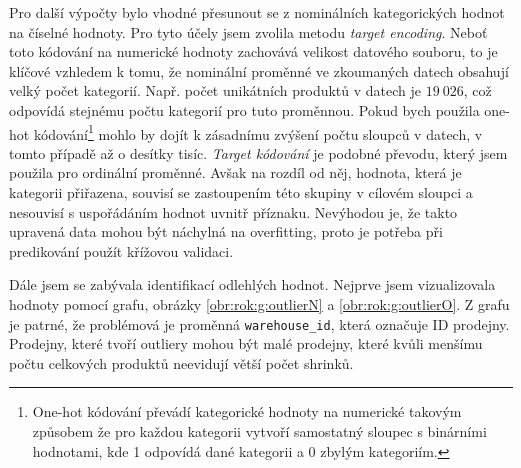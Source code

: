 Pro další výpočty bylo vhodné přesunout se z nominálních kategorických hodnot na číselné hodnoty. Pro tyto účely jsem zvolila metodu \emph{target encoding}.  %
Neboť toto kódování na numerické hodnoty zachovává velikost datového souboru, to je klíčové vzhledem k tomu, že nominální proměnné ve zkoumaných datech obsahují velký počet kategorií. Např. počet unikátních produktů v datech je $19\ 026$, což odpovídá stejnému počtu kategorií pro tuto proměnnou. Pokud bych použila one-hot kódování\footnote{One-hot kódování převádí kategorické hodnoty na numerické takovým způsobem že pro každou kategorii vytvoří samostatný sloupec s binárními hodnotami, kde 1 odpovídá dané kategorii a 0 zbylým kategoriím.}  mohlo by dojít k zásadnímu zvýšení počtu sloupců v datech, v tomto případě až o desítky tisíc. \emph{Target kódování} je podobné převodu, který jsem použila pro ordinální proměnné. Avšak na rozdíl od něj, hodnota, která je kategorii přiřazena, souvisí se zastoupením této skupiny v cílovém sloupci a nesouvisí s uspořádáním hodnot uvnitř příznaku. Nevýhodou je, že takto upravená data mohou být náchylná na overfitting, proto je potřeba při predikování použít křížovou validaci.\cite{bib:encoding}


Dále jsem se zabývala identifikací odlehlých hodnot. Nejprve jsem vizualizovala hodnoty pomocí grafu, obrázky \ref*{obr:rok:g:outlierN} a \ref*{obr:rok:g:outlierO}. Z grafu je patrné, že problémová je proměnná \texttt{warehouse\_id}, která označuje ID prodejny. Prodejny, které tvoří outliery mohou být malé prodejny, které kvůli menšímu počtu celkových produktů neevidují větší počet shrinků. %


